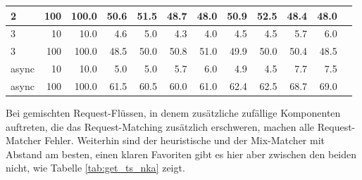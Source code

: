 \documentclass[12pt,a4paper]{report}
\begin{document}
\begin{table}[H]
\begin{tabular}{|l|r|r|r|r|r|r|r|r|r|r|r|}
		2                        & 100                            & 100.0                          & 50.6                          & 51.5                          & 48.7                            & 48.0 & 50.9 & 52.5 & 48.4 & 48.0 \\ \hline
		3                        & 10                             & 10.0                           & 4.6                           & 5.0                           & 4.3                             & 4.0  & 4.5  & 4.5  & 5.7  & 6.0  \\ \hline
		3                        & 100                            & 100.0                          & 48.5                          & 50.0                          & 50.8                            & 51.0 & 49.9 & 50.0 & 50.4 & 48.5 \\ \hline
		async                    & 10                             & 10.0                           & 5.0                           & 5.0                           & 5.7                             & 6.0  & 4.9  & 4.5  & 7.7  & 7.5  \\ \hline
		async                    & 100                            & 100.0                          & 61.5                          & 60.5                          & 60.0                            & 61.0 & 62.4 & 62.5 & 68.7 & 69.0 \\ \hline
	\end{tabular}
\end{table}

Bei gemischten Request-Flüssen, in denem zusätzliche zufällige Komponenten auftreten, die das Request-Matching zusätzlich erschweren,
machen alle Request-Matcher Fehler. Weiterhin sind der heuristische und der Mix-Matcher mit Abstand am besten, einen
klaren Favoriten gibt es hier aber zwischen den beiden nicht, wie Tabelle \ref{tab:get_ts_nka} zeigt.
\end{document}
